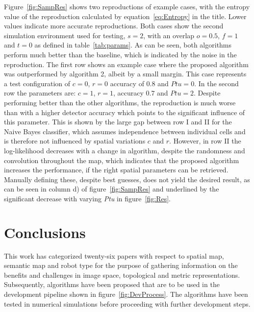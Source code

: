 \documentclass[twocolumn,letterpaper]{IEEEAerospaceCLS}  %
\begin{document}
Figure~\ref{fig:SampRes} shows two reproductions of example cases, with the entropy value of the reproduction calculated by equation~\ref{eq:Entropy} in the title. Lower values indicate more accurate reproductions. Both cases show the second simulation environment used for testing, $s = 2$, with an overlap $o = 0.5$, $f = 1$ and $t= 0 $ as defined in table~\ref{tab:params}. As can be seen, both algorithms perform much better than the baseline, which is indicated by the noise in the reproduction. The first row shows an example case where the proposed algorithm was outperformed by algorithm 2, albeit by a small margin. This case represents a test configuration of $c = 0$, $r = 0$ accuracy of $0.8$ and $Ptu = 0$.  In the second row the parameters are: $c =1$, $r = 1$, accuracy $0.7$ and $Ptu = 2$.
Despite performing better than the other algorithms, the reproduction is much worse than with a higher detector accuracy which points to the significant influence of this parameter. This is shown by the large gap between row I and II for the Naive Bayes classifier, which assumes independence between individual cells and is therefore not influenced by spatial variations $c$ and $r$. However, in row II the log-likelihood decreases with a change in algorithm, despite the randomness and convolution throughout the map, which indicates that the proposed algorithm increases the performance, if the right spatial parameters can be retrieved. Manually defining these, despite best guesses, does not yield the desired result, as can be seen in column d) of figure~\ref{fig:SampRes} and underlined by the significant decrease with varying \emph{Ptu} in figure~\ref{fig:Res}.
\section{Conclusions} \label{sec:Concl}
This work has categorized twenty-six papers with respect to spatial map, semantic map and robot type for the purpose of gathering information on the benefits and challenges in image space, topological and metric representations. Subsequently, algorithms have been proposed that are to be used in the development pipeline shown in figure~\ref{fig:DevProcess}. The algorithms have been tested in numerical simulations before proceeding with further development steps.
\end{document}
